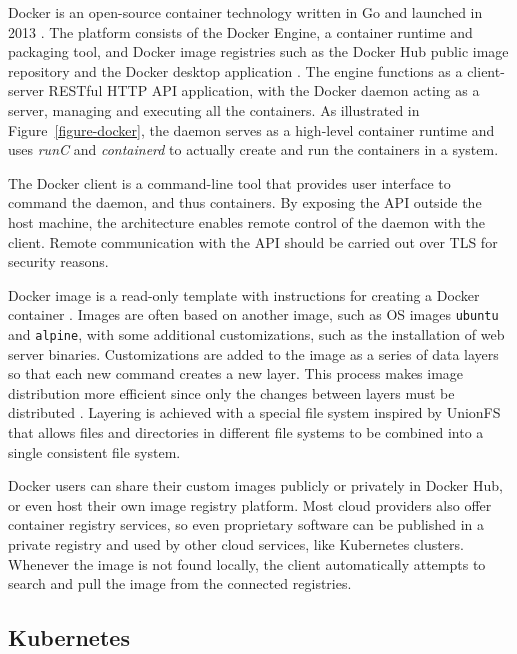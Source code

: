 \documentclass[english, 12pt, a4paper, sci, utf8, a-2b, online]{aaltothesis}
\begin{document}
Docker is an open-source container technology written in Go and launched in 2013 \cite{docker-what}.
The platform consists of the Docker Engine, a container runtime and packaging tool, and Docker image registries such as the Docker Hub public image repository and the Docker desktop application \cite{docker-overview}.
The engine functions as a client-server RESTful HTTP API application, with the Docker daemon acting as a server, managing and executing all the containers.
As illustrated in Figure~\ref*{figure-docker}, the daemon serves as a high-level container runtime and uses \emph{runC} and \emph{containerd} to actually create and run the containers in a system.

The Docker client is a command-line tool that provides user interface to command the daemon, and thus containers.
By exposing the API outside the host machine, the architecture enables remote control of the daemon with the client.
Remote communication with the API should be carried out over TLS for security reasons.

Docker image is a read-only template with instructions for creating a Docker container \cite{docker-overview}.
Images are often based on another image, such as OS images \texttt{ubuntu} and \texttt{alpine}, with some additional customizations, such as the installation of web server binaries.
Customizations are added to the image as a series of data layers so that each new command creates a new layer.
This process makes image distribution more efficient since only the changes between layers must be distributed \cite{bui2015analysis}.
Layering is achieved with a special file system inspired by UnionFS that allows files and directories in different file systems to be combined into a single consistent file system.

Docker users can share their custom images publicly or privately in Docker Hub, or even host their own image registry platform.
Most cloud providers also offer container registry services, so even proprietary software can be published in a private registry and used by other cloud services, like Kubernetes clusters.
Whenever the image is not found locally, the client automatically attempts to search and pull the image from the connected registries.

\subsection{Kubernetes}
\end{document}
